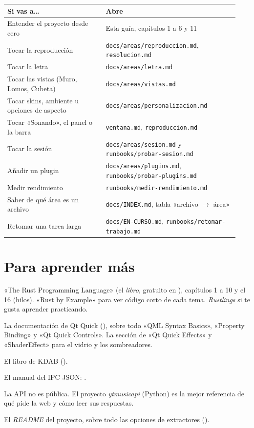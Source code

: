 \begin{center}
\small
\begin{longtable}{@{}p{0.4\linewidth}p{0.54\linewidth}@{}}
\toprule
Si vas a\dots & Abre \\
\midrule
\endhead
Entender el proyecto desde cero & Esta guía, capítulos 1 a 6 y 11 \\
Tocar la reproducción & \texttt{docs/areas/reproduccion.md}, \texttt{resolucion.md} \\
Tocar la letra & \texttt{docs/areas/letra.md} \\
Tocar las vistas (Muro, Lomos, Cubeta) & \texttt{docs/areas/vistas.md} \\
Tocar skins, ambiente u opciones de aspecto & \texttt{docs/areas/personalizacion.md} \\
Tocar «Sonando», el panel o la barra & \texttt{ventana.md}, \texttt{reproduccion.md} \\
Tocar la sesión & \texttt{docs/areas/sesion.md} y \texttt{runbooks/probar-sesion.md} \\
Añadir un plugin & \texttt{docs/areas/plugins.md}, \texttt{runbooks/probar-plugins.md} \\
Medir rendimiento & \texttt{runbooks/medir-rendimiento.md} \\
Saber de qué área es un archivo & \texttt{docs/INDEX.md}, tabla «archivo $\rightarrow$ área» \\
Retomar una tarea larga & \texttt{docs/EN-CURSO.md}, \texttt{runbooks/retomar-trabajo.md} \\
\bottomrule
\end{longtable}
\end{center}

\section{Para aprender más}

\begin{description}[style=nextline, leftmargin=0pt]
  \item[Rust] «The Rust Programming Language» (el \emph{libro}, gratuito en
  ), capítulos 1 a 10 y el 16 (hilos). «Rust by Example» para ver
  código corto de cada tema. \emph{Rustlings} si te gusta aprender practicando.
  \item[QML] La documentación de Qt Quick (), sobre todo «QML Syntax Basics»,
  «Property Binding» y «Qt Quick Controls». La sección de «Qt Quick Effects» y
  «ShaderEffect» para el vidrio y los sombreadores.
  \item[cxx-qt] El libro de KDAB ().
  \item[mpv] El manual del IPC JSON: .
  \item[YouTube Music] La API no es pública. El proyecto \emph{ytmusicapi} (Python) es la mejor
  referencia de qué pide la web y cómo leer sus respuestas.
  \item[yt-dlp] El \emph{README} del proyecto, sobre todo las opciones de extractores
  ().
\end{description}

